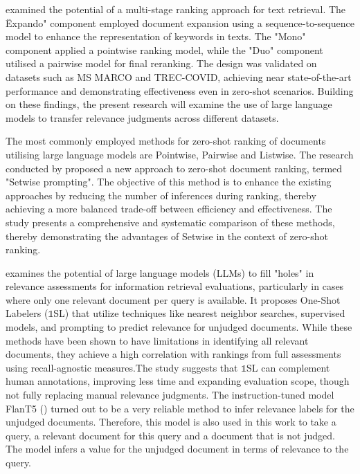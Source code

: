 \citet{pradeep:2021} examined the potential of a multi-stage ranking approach for text retrieval. The \"Expando" component employed document expansion using a sequence-to-sequence model to enhance the representation of keywords in texts. The "Mono" component applied a pointwise ranking model, while the "Duo" component utilised a pairwise model for final reranking. The design was validated on datasets such as MS MARCO and TREC-COVID, achieving near state-of-the-art performance and demonstrating effectiveness even in zero-shot scenarios. Building on these findings, the present research will examine the use of large language models to transfer relevance judgments across different datasets.

The most commonly employed methods for zero-shot ranking of documents utilising large language models are Pointwise, Pairwise and Listwise. The research conducted by \citet{zhuang:2024} proposed a new approach to zero-shot document ranking, termed "Setwise prompting". The objective of this method is to enhance the existing approaches by reducing the number of inferences during ranking, thereby achieving a more balanced trade-off between efficiency and effectiveness. The study presents a comprehensive and systematic comparison of these methods, thereby demonstrating the advantages of Setwise in the context of zero-shot ranking.

\cite{macavaney:2023} examines the potential of large language models (LLMs) to fill "holes" in relevance assessments for information retrieval evaluations, particularly in cases where only one relevant document per query is available. It proposes One-Shot Labelers ($\mathbb{1}$SL) that utilize techniques like nearest neighbor searches, supervised models, and prompting to predict relevance for unjudged documents. While these methods have been shown to have limitations in identifying all relevant documents, they achieve a high correlation with rankings from full assessments using recall-agnostic measures.The study suggests that $\mathbb{1}$SL can complement human annotations, improving less time and expanding evaluation scope, though not fully replacing manual relevance judgments. The instruction-tuned model FlanT5 (\citet{chung:2022}) turned out to be a very reliable method to infer relevance labels for the unjudged documents. Therefore, this model is also used in this work to take a query, a relevant document for this query and a document that is not judged. The model infers a value for the unjudged document in terms of relevance to the query.
